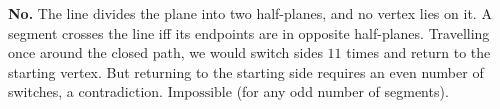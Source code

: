 \textbf{No.} The line divides the plane into two half-planes, and no vertex lies on it. A segment crosses the line iff its endpoints are in opposite half-planes. Travelling once around the closed path, we would switch sides $11$ times and return to the starting vertex. But returning to the starting side requires an even number of switches, a contradiction. $\boxed{\text{Impossible}}$ (for any odd number of segments).

